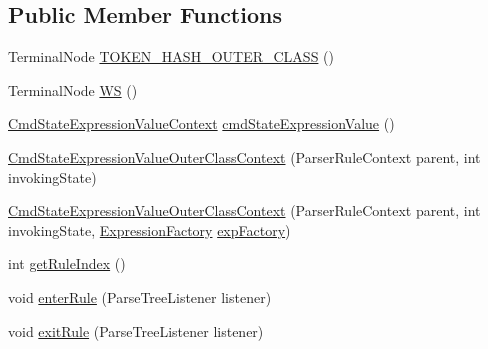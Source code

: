 \subsection*{Public Member Functions}
\begin{DoxyCompactItemize}
\item 
Terminal\+Node \hyperlink{classgov_1_1nasa_1_1jpf_1_1inspector_1_1server_1_1expression_1_1parser_1_1_expression_grammar_paa97aac802c11881ff9166c765f4fc61a_aed9eca132a843193d3b014498c41114f}{T\+O\+K\+E\+N\+\_\+\+H\+A\+S\+H\+\_\+\+O\+U\+T\+E\+R\+\_\+\+C\+L\+A\+SS} ()
\item 
Terminal\+Node \hyperlink{classgov_1_1nasa_1_1jpf_1_1inspector_1_1server_1_1expression_1_1parser_1_1_expression_grammar_paa97aac802c11881ff9166c765f4fc61a_a8ddfcb7526a4145f3fc36e2b9736de55}{WS} ()
\item 
\hyperlink{classgov_1_1nasa_1_1jpf_1_1inspector_1_1server_1_1expression_1_1parser_1_1_expression_grammar_pa17ff9e538e96e94398ba5af02b5ffa30}{Cmd\+State\+Expression\+Value\+Context} \hyperlink{classgov_1_1nasa_1_1jpf_1_1inspector_1_1server_1_1expression_1_1parser_1_1_expression_grammar_paa97aac802c11881ff9166c765f4fc61a_a92ec4075c353839a5012d53556077ecc}{cmd\+State\+Expression\+Value} ()
\item 
\hyperlink{classgov_1_1nasa_1_1jpf_1_1inspector_1_1server_1_1expression_1_1parser_1_1_expression_grammar_paa97aac802c11881ff9166c765f4fc61a_a3c6ffe82f2af4d5d98f640baa46f1fe5}{Cmd\+State\+Expression\+Value\+Outer\+Class\+Context} (Parser\+Rule\+Context parent, int invoking\+State)
\item 
\hyperlink{classgov_1_1nasa_1_1jpf_1_1inspector_1_1server_1_1expression_1_1parser_1_1_expression_grammar_paa97aac802c11881ff9166c765f4fc61a_a64e2c0184af7dbafa974f3f8fac9baf2}{Cmd\+State\+Expression\+Value\+Outer\+Class\+Context} (Parser\+Rule\+Context parent, int invoking\+State, \hyperlink{classgov_1_1nasa_1_1jpf_1_1inspector_1_1server_1_1expression_1_1_expression_factory}{Expression\+Factory} \hyperlink{classgov_1_1nasa_1_1jpf_1_1inspector_1_1server_1_1expression_1_1parser_1_1_expression_grammar_paa97aac802c11881ff9166c765f4fc61a_af24a19c5858a26b193e92d9fdced78c4}{exp\+Factory})
\item 
int \hyperlink{classgov_1_1nasa_1_1jpf_1_1inspector_1_1server_1_1expression_1_1parser_1_1_expression_grammar_paa97aac802c11881ff9166c765f4fc61a_a2b29fc86a0a50f4feff70f9932c4b6bb}{get\+Rule\+Index} ()
\item 
void \hyperlink{classgov_1_1nasa_1_1jpf_1_1inspector_1_1server_1_1expression_1_1parser_1_1_expression_grammar_paa97aac802c11881ff9166c765f4fc61a_a6d22e692bba6d6ff18233c555a856e3b}{enter\+Rule} (Parse\+Tree\+Listener listener)
\item 
void \hyperlink{classgov_1_1nasa_1_1jpf_1_1inspector_1_1server_1_1expression_1_1parser_1_1_expression_grammar_paa97aac802c11881ff9166c765f4fc61a_a55c5c84cb8a20ad8272810383dec1e55}{exit\+Rule} (Parse\+Tree\+Listener listener)
\end{DoxyCompactItemize}
